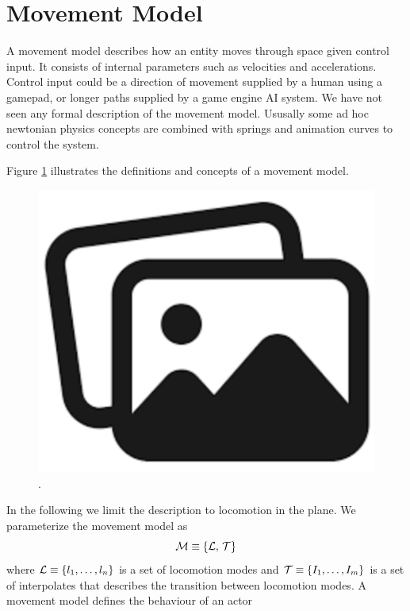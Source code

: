 \section{Movement Model}
A movement model describes how an entity moves through space given control input. It consists of internal parameters such as velocities and accelerations. Control input could be a direction of movement supplied by a human using a gamepad, or longer paths supplied by a game engine AI system. We have not seen any formal description of the movement model. Ususally some ad hoc newtonian physics concepts are combined with springs and animation curves to control the system.

Figure \ref{fig:movement:model} illustrates the definitions and concepts of a movement model.
\begin{figure}
    \centering
    \includegraphics[width=0.75\columnwidth]{img/temporary.png}
    \caption{.}
    \label{fig:movement:model}
\end{figure}
In the following we limit  the description to locomotion in the plane. We parameterize the movement model as 
\begin{equation}
    \label{eq:model:parameterization}
 \mathcal{M} \equiv 
 \left\{ \mathcal{L},\,\mathcal{T} \right\}
\end{equation}
where $\mathcal{L} \equiv \left\{  l_1, \ldots, l_n \right\}$ is a set of locomotion modes and $\mathcal{T} \equiv \left\{  I_1, \ldots, I_m \right\}$ is a set of interpolates that describes the transition between locomotion modes.  A movement model defines the behaviour of an actor 
